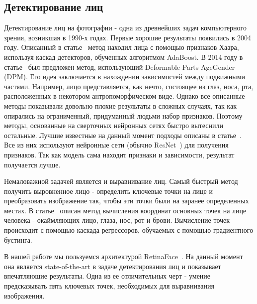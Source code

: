 \subsection{Детектирование лиц}\label{subsec:детектирование-лиц}
Детектирование лиц на фотографии - одна из древнейших задач компьютерного зрения, возникшая в 1990-х годах.
Первые хорошие результаты появились в 2004 году.
Описанный в статье~\cite{face_detection} метод находил лица с помощью признаков Хаара, используя каскад детекторов, обученных алгоритмом AdaBoost.
В 2014 году в статье~\cite{face_detection2} был предложен метод, использующий Deformable Parts AgeGender (DPM).
Его идея заключается в нахождении зависимостей между подвижными частями.
Например, лицо представляется, как нечто, состоящее из глаз, носа, рта, расположенных в некотором антропоморфическом виде.
Однако все описанные методы показывали довольно плохие результаты в сложных случаях, так как опирались на ограниченный, придуманный людьми набор признаков.
Поэтому методы, основанные на сверточных нейронных сетях быстро вытеснили остальные.
Лучшие известные на данный момент подходы описаны в статье~\cite{face_detection3}.
Все из них используют нейронные сети (обычно ResNet~\cite{resnet}) для получения признаков.
Так как модель сама находит признаки и зависимости, результат получается лучше.
\par Немаловажной задачей является и выравнивание лиц.
Самый быстрый метод получить выровненное лицо - определить ключевые точки на лице и преобразовать изображение так, чтобы эти точки были на заранее определенных местах.
В статье~\cite{align} описан метод вычисления координат основных точек на лице человека - окаймляющих лицо, глаза, нос, рот и брови.
Вычисление точек происходит с помощью каскада регрессоров, обучаемых с помощью градиентного бустинга.
\par В нашей работе мы пользуемся архитектурой RetinaFace~\cite{retinaface}.
На данный момент она является state-of-the-art в задаче детектирования лиц и показывает впечатляющие результаты.
Одна из ее отличительных черт - умение предсказывать пять ключевых точек, необходимых для выравнивания изображения.

